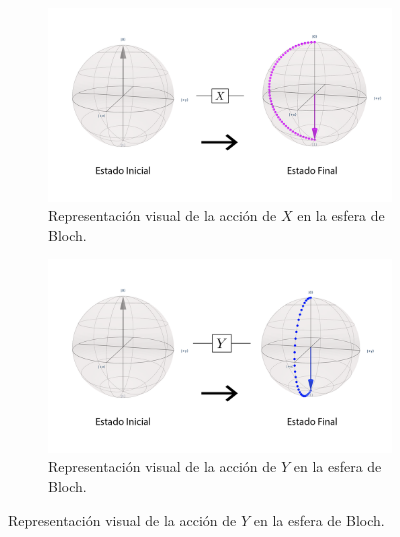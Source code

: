 \documentclass[letterpaper,12pt]{thesisECFM}
\theoremstyle{plain}
\theoremstyle{definition}
\theoremstyle{definition}
\theoremstyle{remark}
\newcommand{\1}{\mathbb{1}}
\begin{document}
\begin{figure}[h!] %
    \centering
    \begin{subfigure}{0.45\textwidth}
        \centering
        \includegraphics[width=\linewidth]{imagenes/Paulix.png}
        \caption{Representación visual de la acción de $X$ en la esfera de Bloch.}
        \label{fig:choi_p0.1}
    \end{subfigure}
    \hspace{1em} %
    \begin{subfigure}{0.45\textwidth}
        \centering
        \includegraphics[width=\linewidth]{imagenes/Pauliy.png}
        \caption{Representación visual de la acción de $Y$ en la esfera de Bloch.}
        \label{fig:choi_p0.9}
    \end{subfigure}


\end{figure}
\end{document}
